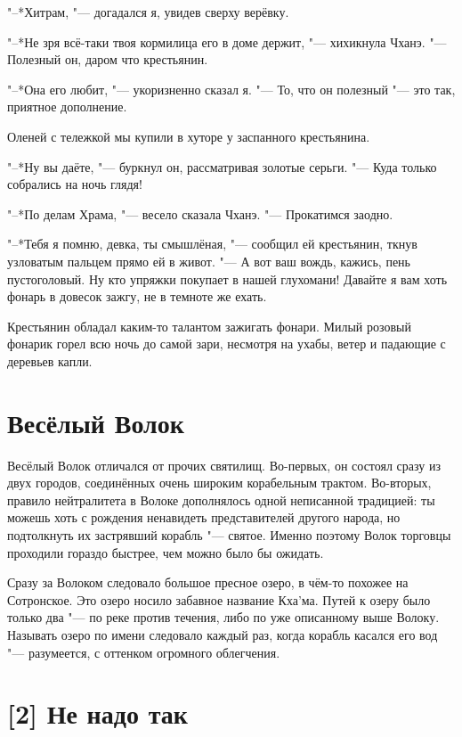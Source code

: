 "--*Хитрам, "--- догадался я, увидев сверху верёвку.

"--*Не зря всё-таки твоя кормилица его в доме держит, "--- хихикнула Чханэ.
"--- Полезный он, даром что крестьянин.

"--*Она его любит, "--- укоризненно сказал я.
"--- То, что он полезный "--- это так, приятное дополнение.

\razd

Оленей с тележкой мы купили в хуторе у заспанного крестьянина.

"--*Ну вы даёте, "--- буркнул он, рассматривая золотые серьги.
"--- Куда только собрались на ночь глядя!

"--*По делам Храма, "--- весело сказала Чханэ.
"--- Прокатимся заодно.

"--*Тебя я помню, девка, ты смышлёная, "--- сообщил ей крестьянин, ткнув узловатым пальцем прямо ей в живот.
"--- А вот ваш вождь, кажись, пень пустоголовый.
Ну кто упряжки покупает в нашей глухомани!
Давайте я вам хоть фонарь в довесок зажгу, не в темноте же ехать.

Крестьянин обладал каким-то талантом зажигать фонари.
Милый розовый фонарик горел всю ночь до самой зари, несмотря на ухабы, ветер и падающие с деревьев капли.

\section{Весёлый Волок}

Весёлый Волок отличался от прочих святилищ.
Во-первых, он состоял сразу из двух городов, соединённых очень широким корабельным трактом.
Во-вторых, правило нейтралитета в Волоке дополнялось одной неписанной традицией: ты можешь хоть с рождения ненавидеть представителей другого народа, но подтолкнуть их застрявший корабль "--- святое.
Именно поэтому Волок торговцы проходили гораздо быстрее, чем можно было бы ожидать.

Сразу за Волоком следовало большое пресное озеро, в чём-то похожее на Сотронское.
Это озеро носило забавное название Кха'ма\footnotemark.
Путей к озеру было только два "--- по реке против течения, либо по уже описанному выше Волоку.
Называть озеро по имени следовало каждый раз, когда корабль касался его вод "--- разумеется, с оттенком огромного облегчения.

\section{[2] Не надо так}

